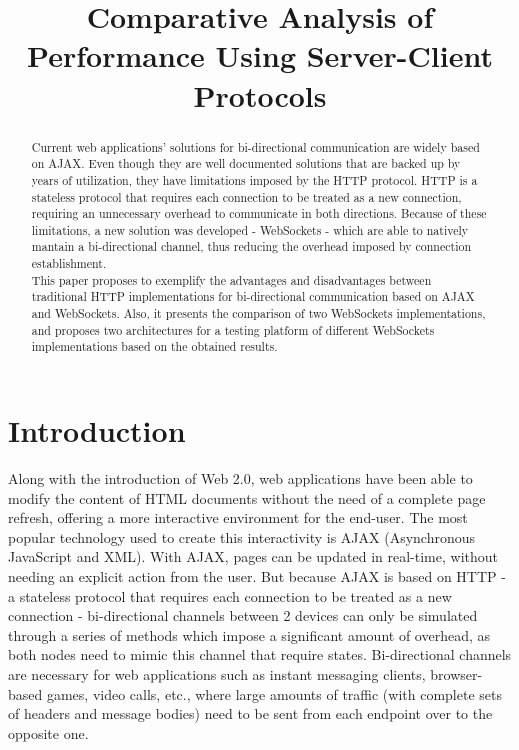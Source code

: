 \documentclass[conference]{IEEEtran}
\begin{document}
\title{Comparative Analysis of Performance Using Server-Client Protocols}

\author{
}

\maketitle

\begin{abstract}
Current web applications' solutions for bi-directional communication are widely
based on AJAX. Even though they are well documented solutions that are backed up by
years of utilization, they have limitations imposed by the HTTP protocol. HTTP
is a stateless protocol that requires each connection to be treated as a new
connection, requiring an unnecessary overhead to communicate in both directions.
Because of these limitations, a new solution was developed - WebSockets -
which are able to natively mantain a bi-directional channel, thus reducing the
overhead imposed by connection establishment.
\\
\indent
This paper proposes to exemplify the advantages and disadvantages between
traditional HTTP implementations for bi-directional communication based on
AJAX and WebSockets. Also, it presents the comparison of two WebSockets
implementations, and proposes two architectures for a testing platform
of different WebSockets implementations based on the obtained results.
\end{abstract}

\IEEEpeerreviewmaketitle

\section{Introduction}
Along with the introduction of Web 2.0, web applications have been able to
modify the content of HTML documents without the need of a complete page
refresh, offering a more interactive environment for the end-user.
The most popular technology used to create this interactivity is AJAX \cite{AJAX}
(Asynchronous JavaScript and XML). With AJAX, pages can be updated in real-time,
without needing an explicit action from the user. But because AJAX is based on
HTTP - a stateless protocol that requires each connection to be treated as a new
connection - bi-directional channels between 2 devices can only be simulated
through a series of methods which impose a significant amount of overhead, as both
nodes need to mimic this channel that require states.
Bi-directional channels are necessary for web applications such as instant
messaging clients, browser-based games, video calls, etc., where large amounts
of traffic (with complete sets of headers and message bodies) need to be sent from
each endpoint over to the opposite one.
\\
\end{document}
